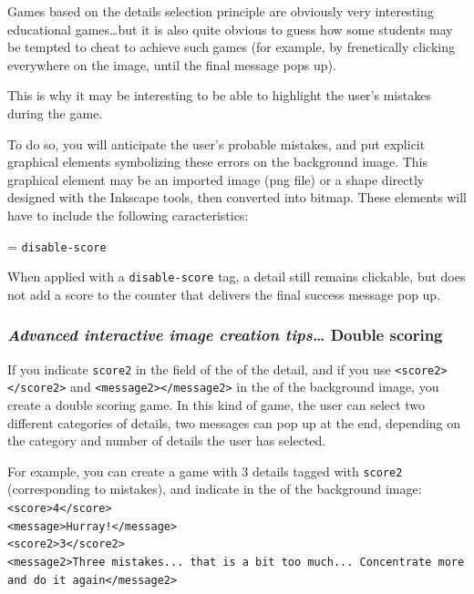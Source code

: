 Games based on the details selection principle are obviously very
interesting educational games\ldots but it is also quite obvious to guess how some 
students may be tempted to cheat to achieve such games (for example, by 
frenetically clicking everywhere on the image, until the final message pops up).

This is why it may be interesting to be able to 
highlight the user's mistakes during the game.

To do so, you will anticipate the user's probable mistakes, and 
put explicit graphical elements symbolizing these errors on the background image. 
This graphical element may be an imported image 
(png file) or a shape directly designed with the Inkscape tools, 
then converted into bitmap. These elements will have to include the following caracteristics:
\begin{center}
 = \verb|disable-score| 
\end{center}
When applied with a \verb|disable-score| tag, a detail still remains clickable, but does not 
add a score to the counter that delivers the final success message pop up.

\subsubsection{\emph{Advanced interactive image creation tips\ldots} Double scoring}

If you indicate \verb|score2| in the  field of the  of the detail,
and if you use \texttt{<score2></score2>} and  \texttt{<message2></message2>} in the  of the 
background image, you create a double scoring game. In this kind of game, the user can select two different categories of details, 
two messages can pop up at the end, depending on the category and number of details the user has selected.

For example, you can create a game with 3 details tagged with \texttt{score2} (corresponding to mistakes), and indicate in the  of the background image:\\
\texttt{<score>4</score>\\
<message>Hurray!</message>\\
<score2>3</score2>\\
<message2>Three mistakes... that is a bit too much... Concentrate more and do it again</message2>}\\


